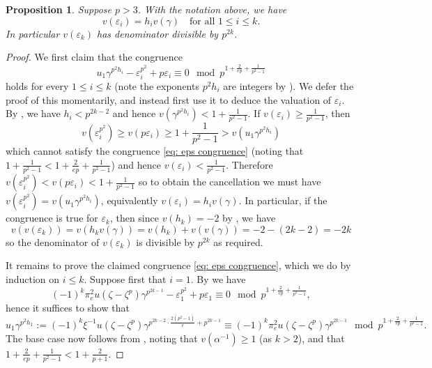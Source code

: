 \documentclass[10pt,a4paper]{amsart}
\newtheorem{proposition}{Proposition}
\begin{document}
\begin{proposition}\label{prop: recursive congruence}
    Suppose $p>3$. With the notation above, we have
    \[
    v(\varepsilon_i) = h_iv(\gamma) \quad \text{for all } 1 \leq i \leq k.
    \]
    In particular $v(\varepsilon_k)$ has denominator divisible by $p^{2k}$.
\end{proposition}

\begin{proof}
    We first claim that the congruence
    \begin{equation}\label{eq: eps congruence}
    u_1 \gamma^{p^2h_i} - \varepsilon_i^{p^2} + p\varepsilon_i \equiv 0 \mod p^{1+\frac{2}{ep} + \frac{1}{p^2-1}}
    \end{equation}
    holds for every $1 \leq i \leq k$ (note the exponents $p^2h_i$ are integers by ). We defer the proof of this momentarily, and instead first use it to deduce the valuation of $\varepsilon_i$. 
    By  , we have $h_i < p^{2k-2}$ and hence $v(\gamma^{p^2h_i})<1+\frac{1}{p^2-1}$. If $v(\varepsilon_i) \geq \frac{1}{p^2-1}$, then
    \[
    v(\varepsilon_i^{p^2}) \geq v(p\varepsilon_i) \geq 1 + \frac{1}{p^2-1} > v(u_1\gamma^{p^2h_i})
    \]
    which cannot satisfy the congruence \eqref{eq: eps congruence} (noting that $1 + \frac{1}{p^2-1}< 1 + \frac{2}{ep}+\frac{1}{p^2-1}$) and hence $v(\varepsilon_i) < \frac{1}{p^2-1}$. Therefore $v(\varepsilon_i^{p^2})< v(p\varepsilon_i)<1+\frac{1}{p^2-1}$ so to obtain the cancellation we must have $v(\varepsilon_i^{p^2})=v(u_1\gamma^{p^2h_i})$, equivalently $v(\varepsilon_i)=h_iv(\gamma)$.
    In particular, if the congruence is true for $\varepsilon_k$, then since $v(h_k)=-2$ by , we have
    \[
    v(v(\varepsilon_k))=v(h_kv(\gamma))=v(h_k)+v(v(\gamma))=-2 -(2k-2) = -2k
    \] 
    so the denominator of $v(\varepsilon_k)$ is divisible by $p^{2k}$ as required.
    
    It remains to prove the claimed congruence \eqref{eq: eps congruence}, which we do by induction on $i \leq k$. Suppose first that $i = 1$. By  we have
    \[
    (-1)^k\pi_e^2u(\zeta-\zeta^p)\gamma^{p^{2k-1}} - \varepsilon_1^{p^2} + p\varepsilon_1 \equiv 0 \mod{p^{1+\frac{2}{ep}+\frac{1}{p^2-1}}},
    \]
    hence it suffices to show that 
    \[
    u_1 \gamma^{p^2h_1} := (-1)^k\xi^{-1}u(\zeta-\zeta^p) \gamma^{p^{2k-2} \cdot\frac{2(p^2-1)}{e} + p^{2k-1}} \equiv (-1)^k\pi_e^2u(\zeta-\zeta^p)\gamma^{p^{2k-1}} \mod p^{1+\frac{2}{ep}+\frac{1}{p^2-1}}.
    \]
    The base case now follows from , noting that $v(\alpha^{-1}) \ge 1$ (as $k>2$), and that $1+ \frac{2}{ep} + \frac{1}{p^2-1} < 1 + \frac{2}{p+1}$.


\end{proof}
\end{document}
